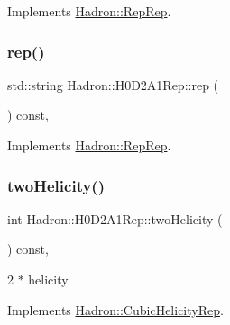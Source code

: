 Implements \mbox{\hyperlink{structHadron_1_1RepRep_ab3213025f6de249f7095892109575fde}{Hadron\+::\+Rep\+Rep}}.

\mbox{\label{structHadron_1_1H0D2A1Rep_ac7e30eadba7f3a5049f2bde305ca28c5}} 
\subsubsection{\texorpdfstring{rep()}{rep()}\hspace{0.1cm}{\footnotesize\ttfamily [5/5]}}
{\footnotesize\ttfamily std\+::string Hadron\+::\+H0\+D2\+A1\+Rep\+::rep (\begin{DoxyParamCaption}{ }\end{DoxyParamCaption}) const\hspace{0.3cm}{\ttfamily [inline]}, {\ttfamily [virtual]}}



Implements \mbox{\hyperlink{structHadron_1_1RepRep_ab3213025f6de249f7095892109575fde}{Hadron\+::\+Rep\+Rep}}.

\mbox{\label{structHadron_1_1H0D2A1Rep_a222dee2dd348d1c79d09ae173d2c2b6f}} 
\subsubsection{\texorpdfstring{twoHelicity()}{twoHelicity()}\hspace{0.1cm}{\footnotesize\ttfamily [1/3]}}
{\footnotesize\ttfamily int Hadron\+::\+H0\+D2\+A1\+Rep\+::two\+Helicity (\begin{DoxyParamCaption}{ }\end{DoxyParamCaption}) const\hspace{0.3cm}{\ttfamily [inline]}, {\ttfamily [virtual]}}

2 $\ast$ helicity 

Implements \mbox{\hyperlink{structHadron_1_1CubicHelicityRep_af507aa56fc2747eacc8cb6c96db31ecc}{Hadron\+::\+Cubic\+Helicity\+Rep}}.

\mbox{\label{structHadron_1_1H0D2A1Rep_a222dee2dd348d1c79d09ae173d2c2b6f}} 
